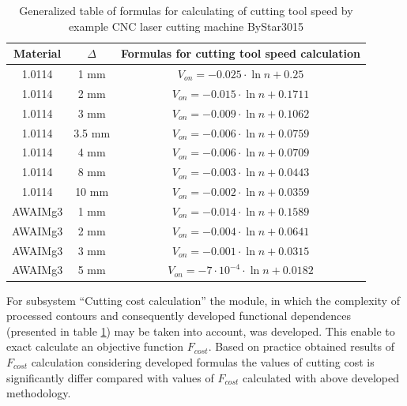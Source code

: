 \documentclass[runningheads]{llncs}
\begin{document}
\begin{table}
  \begin{tabular}{c | c | c }
  Material & $\Delta$ &  Formulas for cutting tool speed calculation \\
  \hline \hline
  1.0114 & 1 mm & $V_{on}=-0.025 \cdot \ln n + 0.25$ \\
  1.0114 & 2 mm & $V_{on}=-0.015 \cdot \ln n + 0.1711$ \\
  1.0114 & 3 mm & $V_{on}=-0.009 \cdot \ln n + 0.1062$ \\
  1.0114 & 3.5 mm & $V_{on}=-0.006 \cdot \ln n + 0.0759$ \\
  1.0114 & 4 mm & $V_{on}=-0.006 \cdot \ln n + 0.0709$ \\
  1.0114 & 8 mm & $V_{on}=-0.003 \cdot \ln n + 0.0443$ \\
  1.0114 & 10 mm & $V_{on}=-0.002 \cdot \ln n + 0.0359$ \\
  AWAIMg3 & 1 mm & $V_{on}=-0.014 \cdot \ln n + 0.1589$ \\
  AWAIMg3 & 2 mm & $V_{on}=-0.004 \cdot \ln n + 0.0641$ \\
  AWAIMg3 & 3 mm & $V_{on}=-0.001 \cdot \ln n + 0.0315$ \\
  AWAIMg3 & 5 mm & $V_{on}=-7 \cdot 10^{-4} \cdot \ln n + 0.0182$ \\
  \hline
  \end{tabular}
  \caption{Generalized table of formulas for calculating of cutting tool speed by example CNC laser cutting machine ByStar3015}
  \label{formulas-table}
\end{table}

For subsystem ``Cutting cost calculation''
the module,
in which the complexity of processed contours
and consequently developed functional dependences
(presented in table \ref{formulas-table})
may be taken into account,
was developed.
This enable to exact calculate an objective function
$F_{cost}$.
Based on practice obtained results of
$F_{cost}$
calculation considering developed formulas
the values of cutting cost is significantly differ
compared with values of
$F_{cost}$
calculated with above developed methodology.
\end{document}
